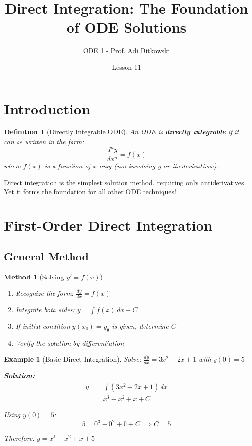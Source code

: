 \documentclass[12pt]{article}
\title{Direct Integration: The Foundation of ODE Solutions}
\author{ODE 1 - Prof. Adi Ditkowski}
\date{Lesson 11}
\newtheorem{definition}{Definition}
\newtheorem{method}{Method}
\newtheorem{example}{Example}
\begin{document}
\maketitle

\section{Introduction}

\begin{definition}[Directly Integrable ODE]
An ODE is \textbf{directly integrable} if it can be written in the form:
$$\frac{d^n y}{dx^n} = f(x)$$
where $f(x)$ is a function of $x$ only (not involving $y$ or its derivatives).
\end{definition}

\begin{keypoint}
Direct integration is the simplest solution method, requiring only antiderivatives. Yet it forms the foundation for all other ODE techniques!
\end{keypoint}

\section{First-Order Direct Integration}

\subsection{General Method}

\begin{method}[Solving $y' = f(x)$]
\begin{enumerate}
    \item Recognize the form: $\frac{dy}{dx} = f(x)$
    \item Integrate both sides: $y = \int f(x)\,dx + C$
    \item If initial condition $y(x_0) = y_0$ is given, determine $C$
    \item Verify the solution by differentiation
\end{enumerate}
\end{method}

\begin{example}[Basic Direct Integration]
Solve: $\frac{dy}{dx} = 3x^2 - 2x + 1$ with $y(0) = 5$

\textbf{Solution:}
\begin{align}
y &= \int (3x^2 - 2x + 1)\,dx\\
&= x^3 - x^2 + x + C
\end{align}

Using $y(0) = 5$:
$$5 = 0^3 - 0^2 + 0 + C \implies C = 5$$

Therefore: $y = x^3 - x^2 + x + 5$
\end{example}
\end{document}
